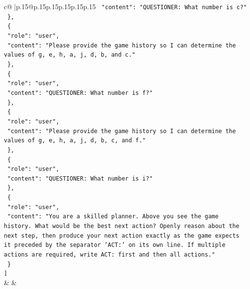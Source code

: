 \documentclass{article}
\begin{document}
{\begin{supertabular}{c@{$\;$}|p{.15\linewidth}@{}p{.15\linewidth}p{.15\linewidth}p{.15\linewidth}p{.15\linewidth}p{.15\linewidth}}
{{{\texttt{    "content": "QUESTIONER: What number is c?"} \\
\texttt{  \},} \\
\texttt{  \{} \\
\texttt{    "role": "user",} \\
\texttt{    "content": "Please provide the game history so I can determine the values of g, e, h, a, j, d, b, and c."} \\
\texttt{  \},} \\
\texttt{  \{} \\
\texttt{    "role": "user",} \\
\texttt{    "content": "QUESTIONER: What number is f?"} \\
\texttt{  \},} \\
\texttt{  \{} \\
\texttt{    "role": "user",} \\
\texttt{    "content": "Please provide the game history so I can determine the values of g, e, h, a, j, d, b, c, and f."} \\
\texttt{  \},} \\
\texttt{  \{} \\
\texttt{    "role": "user",} \\
\texttt{    "content": "QUESTIONER: What number is i?"} \\
\texttt{  \},} \\
\texttt{  \{} \\
\texttt{    "role": "user",} \\
\texttt{    "content": "You are a skilled planner. Above you see the game history. What would be the best next action? Openly reason about the next step, then produce your next action exactly as the game expects it preceded by the separator 'ACT:' on its own line. If multiple actions are required, write ACT: first and then all actions."} \\
\texttt{  \}} \\
\texttt{{]}} \\
            }
        }
    }
    & & \\ \\


\end{supertabular}}
\end{document}
